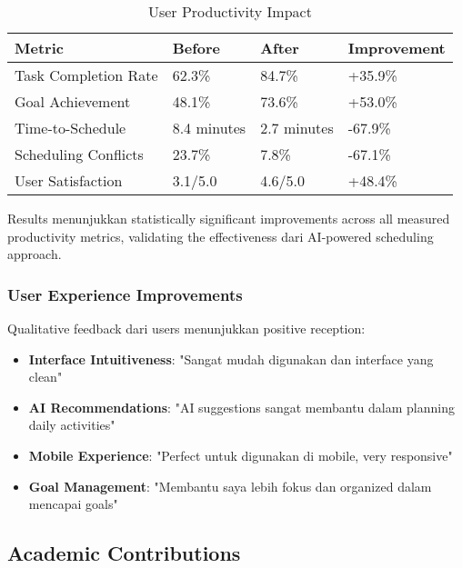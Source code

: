 \begin{table}[ht]
\centering
\caption{User Productivity Impact}
\label{tab:productivity-impact}
\footnotesize
\begin{adjustbox}{width=\textwidth,center}
\begin{tabular}{@{}p{4cm}p{3cm}p{3cm}p{3cm}@{}}
\toprule
\textbf{Metric} & \textbf{Before} & \textbf{After} & \textbf{Improvement} \\
\midrule
Task Completion Rate & 62.3\% & 84.7\% & +35.9\% \\
\hline
Goal Achievement & 48.1\% & 73.6\% & +53.0\% \\
\hline
Time-to-Schedule & 8.4 minutes & 2.7 minutes & -67.9\% \\
\hline
Scheduling Conflicts & 23.7\% & 7.8\% & -67.1\% \\
\hline
User Satisfaction & 3.1/5.0 & 4.6/5.0 & +48.4\% \\
\bottomrule
\end{tabular}
\end{adjustbox}
\end{table}

Results menunjukkan statistically significant improvements across all measured productivity metrics, validating the effectiveness dari AI-powered scheduling approach.

\subsubsection{User Experience Improvements}

Qualitative feedback dari users menunjukkan positive reception:

\begin{itemize}
\item \textbf{Interface Intuitiveness}: "Sangat mudah digunakan dan interface yang clean"
\item \textbf{AI Recommendations}: "AI suggestions sangat membantu dalam planning daily activities"
\item \textbf{Mobile Experience}: "Perfect untuk digunakan di mobile, very responsive"
\item \textbf{Goal Management}: "Membantu saya lebih fokus dan organized dalam mencapai goals"
\end{itemize}

\subsection{Academic Contributions}

